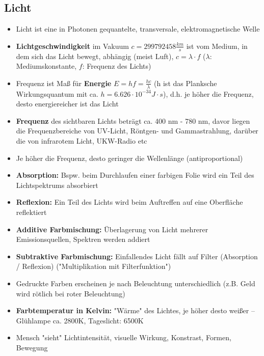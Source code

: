 \documentclass[12pt,landscape]{article}
\begin{document}
\begin{multicols}{3}
\subsection{Licht}
\begin{itemize}
\item Licht ist eine in Photonen gequantelte, 
transversale, elektromagnetische Welle
\item \textbf{Lichtgeschwindigkeit} im Vakuum $c = 299792458 \frac{km}{s}$ ist vom Medium, in dem sich das Licht bewegt, abhängig (meist Luft), $c = \lambda \cdot f$ ($\lambda$: Mediumskonstante, $f$: Frequenz des Lichts)
\item Frequenz ist Maß für \textbf{Energie} $E = hf = \frac{h c}{\lambda}$ (h ist das Planksche Wirkungsquantum mit ca. $h = 6.626 \cdot 10^{-34} J \cdot s$), d.h. je höher die Frequenz, desto energiereicher ist das Licht
\item \textbf{Frequenz} des sichtbaren Lichts beträgt ca. 400 nm - 780 nm, davor liegen die Frequenzbereiche von UV-Licht, Röntgen- und Gammastrahlung, darüber die von infrarotem Licht, UKW-Radio etc
\item Je höher die Frequenz, desto geringer die Wellenlänge (antiproportional)
\item \textbf{Absorption:} Bspw. beim Durchlaufen einer farbigen Folie wird ein Teil des Lichtspektrums absorbiert
\item \textbf{Reflexion:} Ein Teil des Lichts wird beim Auftreffen auf eine Oberfläche reflektiert
\item \textbf{Additive Farbmischung:} Überlagerung von Licht mehrerer Emissionsquellen, Spektren werden addiert
\item \textbf{Subtraktive Farbmischung:} Einfallendes Licht fällt auf Filter (Absorption / Reflexion) ("Multiplikation mit Filterfunktion")
\item Gedruckte Farben erscheinen je nach Beleuchtung unterschiedlich (z.B. Geld wird rötlich bei roter Beleuchtung) 
\item \textbf{Farbtemperatur in Kelvin:} "Wärme" des Lichtes, je höher desto weißer -- Glühlampe ca. 2800K, Tageslicht: 6500K
\item Mensch "sieht" Lichtintensität, visuelle Wirkung, Konstrast, Formen, Bewegung

\end{itemize}
\end{multicols}
\end{document}
